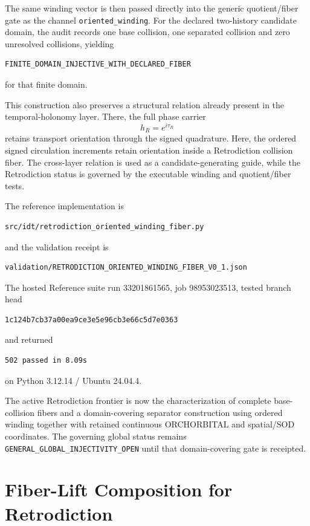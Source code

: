 \documentclass[11pt]{book}
\begin{document}
The same winding vector is then passed directly into the generic quotient/fiber gate as the channel \texttt{oriented\_winding}.  For the declared two-history candidate domain, the audit records one base collision, one separated collision and zero unresolved collisions, yielding
\begin{verbatim}
FINITE_DOMAIN_INJECTIVE_WITH_DECLARED_FIBER
\end{verbatim}
for that finite domain.

This construction also preserves a structural relation already present in the temporal-holonomy layer.  There, the full phase carrier
\[
h_R=e^{i\tau_R}
\]
retains transport orientation through the signed quadrature.  Here, the ordered signed circulation increments retain orientation inside a Retrodiction collision fiber.  The cross-layer relation is used as a candidate-generating guide, while the Retrodiction status is governed by the executable winding and quotient/fiber tests.

The reference implementation is
\begin{verbatim}
src/idt/retrodiction_oriented_winding_fiber.py
\end{verbatim}
and the validation receipt is
\begin{verbatim}
validation/RETRODICTION_ORIENTED_WINDING_FIBER_V0_1.json
\end{verbatim}
The hosted Reference suite run 33201861565, job 98953023513, tested branch head
\begin{verbatim}
1c124b7cb37a00ea9ce3e5e96cb3e66c5d7e0363
\end{verbatim}
and returned
\begin{verbatim}
502 passed in 8.09s
\end{verbatim}
on Python 3.12.14 / Ubuntu 24.04.4.

The active Retrodiction frontier is now the characterization of complete base-collision fibers and a domain-covering separator construction using ordered winding together with retained continuous ORCHORBITAL and spatial/SOD coordinates.  The governing global status remains \texttt{GENERAL\_GLOBAL\_INJECTIVITY\_OPEN} until that domain-covering gate is receipted.

\chapter{Fiber-Lift Composition for Retrodiction}
\label{chap:fiber-lift-composition}
\end{document}
